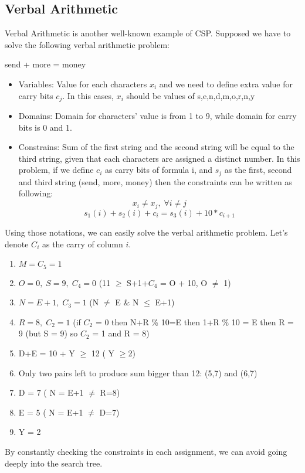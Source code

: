 \documentclass[a4paper, 11pt]{article}
\begin{document}
\subsection{Verbal Arithmetic}
Verbal Arithmetic is another well-known example of CSP. Supposed we have to solve the following verbal arithmetic problem: \\
\begin{center}
  send + more = money
\end{center}
\begin{itemize}
\item Variables: Value for each characters $x_i$ and we need to define extra value for carry bits $c_j$. In this cases, $x_i$ should be values of s,e,n,d,m,o,r,n,y
\item Domains: Domain for characters' value is from 1 to 9, while domain for carry bits is 0 and 1.
\item Constrains: Sum of the first string and the second string will be equal to the third string, given that each characters are assigned a distinct number. In this problem, if we define $c_i$ as carry bits of formula i, and $s_j$ as the first, second and third string (send, more, money) then the constraints can be written as following:\\
  \[ x_i \neq x_j, \; \forall i\neq j\]
  \[ s_1(i)+s_2(i) + c_{i} = s_3(i) + 10*c_{i+1}\]
\end{itemize}
Using those notations, we can easily solve the verbal arithmetic problem. Let's denote $C_i$ as the carry of column $i$.
\begin{enumerate}
\item $M = C_5 = 1$
\item $O = 0, \; S = 9, \; C_4 = 0$ (11 $\geq$ S+1+$C_4$ = O + 10, O $\neq$ 1)
\item $N = E + 1, \; C_3 = 1$ (N $\neq$ E \& N $\leq$ E+1)
\item $R = 8, \; C_2 = 1$ (if $C_2$ = 0 then N+R \% 10=E then 1+R \% 10 = E then R = 9 (but S = 9) so $C_2$ = 1 and R = 8)
\item D+E = 10 + Y $\geq$ 12 ( Y $\geq$2)
\item Only two pairs left to produce sum bigger than 12: (5,7) and (6,7)
\item D = 7 ( N = E+1 $\neq$ R=8)
\item E = 5 ( N = E+1 $\neq$ D=7)
\item Y = 2
\end{enumerate}
By constantly checking the constraints in each assignment, we can avoid going deeply into the search tree.
\newpage
\end{document}
